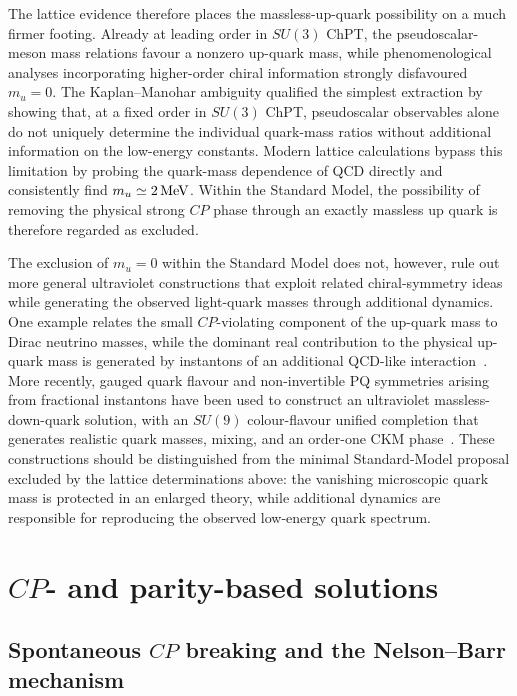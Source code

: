 \documentclass[review]{elsarticle}
\numberwithin{equation}{section}
\numberwithin{table}{section}
\numberwithin{figure}{section}
\begin{document}
The lattice evidence therefore places the massless-up-quark possibility on a much firmer footing. Already at leading order in $SU(3)$ ChPT, the pseudoscalar-meson mass relations favour a nonzero up-quark mass, while phenomenological analyses incorporating higher-order chiral information strongly disfavoured $m_u=0$. The Kaplan--Manohar ambiguity qualified the simplest extraction by showing that, at a fixed order in $SU(3)$ ChPT, pseudoscalar observables alone do not uniquely determine the individual quark-mass ratios without additional information on the low-energy constants. Modern lattice calculations bypass this limitation by probing the quark-mass dependence of QCD directly and consistently find $m_u\simeq2\,{\rm MeV}$. Within the Standard Model, the possibility of removing the physical strong $CP$ phase through an exactly massless up quark is therefore regarded as excluded. 

The exclusion of $m_u=0$ within the Standard Model does not, however, rule out more general ultraviolet constructions that exploit related chiral-symmetry ideas while generating the observed light-quark masses through additional dynamics. One example relates the small $CP$-violating component of the up-quark mass to Dirac neutrino masses, while the dominant real contribution to the physical up-quark mass is generated by instantons of an additional QCD-like interaction~\cite{Carena:2019nnd}. More recently, gauged quark flavour and non-invertible PQ symmetries arising from fractional instantons have been used to construct an ultraviolet massless-down-quark solution, with an $SU(9)$ colour-flavour unified completion that generates realistic quark masses, mixing, and an order-one CKM phase~\cite{Cordova:2024ypu}. These constructions should be distinguished from the minimal Standard-Model proposal excluded by the lattice determinations above: the vanishing microscopic quark mass is protected in an enlarged theory, while additional dynamics are responsible for reproducing the observed low-energy quark spectrum.

\section{\texorpdfstring{$CP$}{CP}- and parity-based solutions}
\label{sec:CP&P}

\subsection{Spontaneous \texorpdfstring{$CP$}{CP} breaking and the Nelson--Barr mechanism}
\label{sec:Nelson-Barr}
\end{document}
